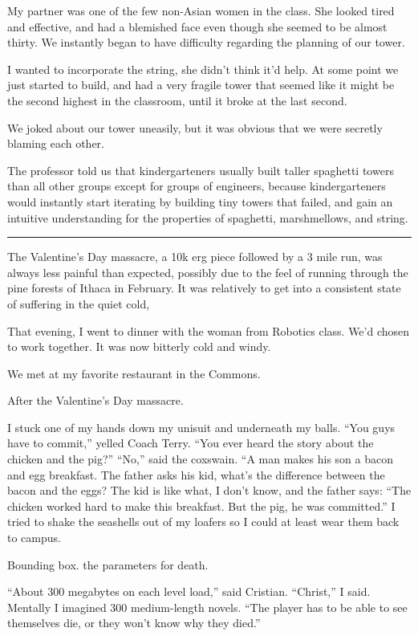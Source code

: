 My partner was one of the few non-Asian women in the class.  She looked tired
and effective, and had a blemished face even though she seemed to be almost
thirty.  We instantly began to have difficulty regarding the planning of our
tower.  

I wanted to incorporate the string, she didn't think it'd help.  At some point
we just started to build, and had a very fragile tower that seemed like it might
be the second highest in the classroom, until it broke at the last second.

We joked about our tower uneasily, but it was obvious that we were secretly
blaming each other.

The professor told us that kindergarteners usually built taller spaghetti towers
than all other groups except for groups of engineers, because kindergarteners
would instantly start iterating by building tiny towers that failed, and gain an
intuitive understanding for the properties of spaghetti, marshmellows, and
string.  

\plainfancybreak{12pt}{2}{* * *}

The Valentine's Day massacre, a 10k erg piece followed by a 3 mile run, was
always less painful than expected, possibly due to the feel of running through
the pine forests of Ithaca in February.  It was relatively to get into a
consistent state of suffering in the quiet cold, 

That evening, I went to dinner with the woman from Robotics class.  We'd chosen
to work together.  It was now bitterly cold and windy.

We met at my favorite restaurant in the Commons.



After the Valentine's Day massacre.

I stuck one of my hands down my unisuit and underneath my balls.  ``You guys
have to commit,'' yelled Coach Terry.  ``You ever heard the story about the
chicken and the pig?'' ``No,'' said the coxswain.  ``A man makes his son a bacon
and egg breakfast.  The father asks his kid, what's the difference between the
bacon and the eggs?  The kid is like what, I don't know, and the father says:
``The chicken worked hard to make this breakfast.  But the pig, he was
committed.'' I tried to shake the seashells out of my loafers so I could at
least wear them back to campus. 

Bounding box.  the parameters for death.

``About 300 megabytes on each level load,'' said Cristian.  ``Christ,'' I said.
Mentally I imagined 300 medium-length novels.  ``The player has to be able to
see themselves die, or they won't know why they died.'' 

